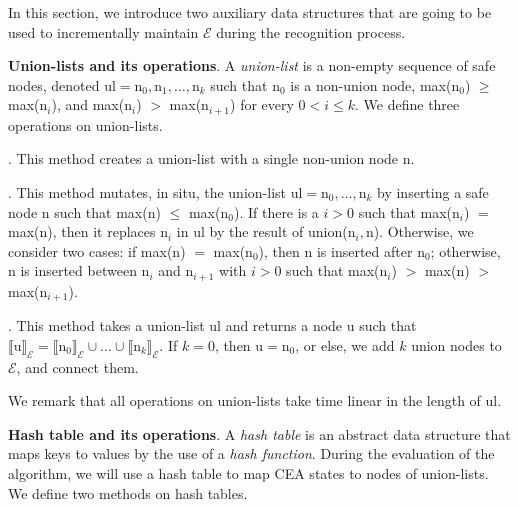 In this section, we introduce two auxiliary data structures that are going to be used to incrementally maintain $\mathcal{E}$ during the recognition process.

\textbf{Union-lists and its operations}. A \emph{union-list} is a non-empty sequence of safe nodes, denoted $\textrm{ul} = \textrm{n}_{0}, \textrm{n}_{1}, \ldots, \textrm{n}_{k}$ such that $\textrm{n}_{0}$ is a non-union node, max($\textrm{n}_{0}$) $\ge$ max($\textrm{n}_{i}$), and max($\textrm{n}_{i}$) $>$ max($\textrm{n}_{i+1}$) for every $0 < i \le k$. We define three operations on union-lists.

. This method creates a union-list with a single non-union node \textrm{n}.

. This method mutates, in situ, the union-list $\textrm{ul} = \textrm{n}_{0}, \ldots, \textrm{n}_{k}$ by inserting a safe node \textrm{n} such that max($\textrm{n}$) $\le$ max($\textrm{n}_{0}$). If there is a $i > 0$ such that max($\textrm{n}_{i}$) $=$ max($\textrm{n}$), then it replaces $\textrm{n}_{i}$ in \textrm{ul} by the result of union($\textrm{n}_{i}, \textrm{n}$). Otherwise, we consider two cases: if max($\textrm{n}$) $=$ max($\textrm{n}_{0}$), then \textrm{n} is inserted after $\textrm{n}_{0}$; otherwise,  \textrm{n} is inserted between $\textrm{n}_{i}$ and $\textrm{n}_{i+1}$ with $i > 0$ such that max($\textrm{n}_{i}$) $>$ max($\textrm{n}$) $>$ max($\textrm{n}_{i+1}$).

. This method takes a union-list \textrm{ul} and returns a node \textrm{u} such that ${\llbracket \textrm{u} \rrbracket}_{\mathcal{E}} = {\llbracket \textrm{n}_{0} \rrbracket}_{\mathcal{E}} \cup \ldots \cup {\llbracket \textrm{n}_{k} \rrbracket}_{\mathcal{E}} $. If $k = 0$, then $\textrm{u} = \textrm{n}_{0}$, or else, we add $k$ union nodes to $\mathcal{E}$, and connect them.


We remark that all operations on union-lists take time linear in the length of \textrm{ul}.

\newpage

\textbf{Hash table and its operations}. A \emph{hash table} is an abstract data structure that maps keys to values by the use of a \emph{hash function}. During the evaluation of the algorithm, we will use a hash table to map CEA states to nodes of union-lists. We define two methods on hash tables.

